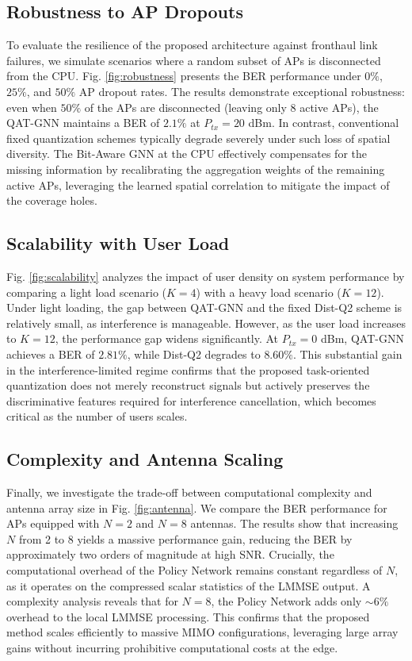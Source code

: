 \subsection{Robustness to AP Dropouts}
To evaluate the resilience of the proposed architecture against fronthaul link failures, we simulate scenarios where a random subset of APs is disconnected from the CPU. Fig. \ref{fig:robustness} presents the BER performance under $0\%$, $25\%$, and $50\%$ AP dropout rates. The results demonstrate exceptional robustness: even when $50\%$ of the APs are disconnected (leaving only 8 active APs), the QAT-GNN maintains a BER of $2.1\%$ at $P_{tx}=20$ dBm. In contrast, conventional fixed quantization schemes typically degrade severely under such loss of spatial diversity. The Bit-Aware GNN at the CPU effectively compensates for the missing information by recalibrating the aggregation weights of the remaining active APs, leveraging the learned spatial correlation to mitigate the impact of the coverage holes.

\subsection{Scalability with User Load}
Fig. \ref{fig:scalability} analyzes the impact of user density on system performance by comparing a light load scenario ($K=4$) with a heavy load scenario ($K=12$). Under light loading, the gap between QAT-GNN and the fixed Dist-Q2 scheme is relatively small, as interference is manageable. However, as the user load increases to $K=12$, the performance gap widens significantly. At $P_{tx}=0$ dBm, QAT-GNN achieves a BER of $2.81\%$, while Dist-Q2 degrades to $8.60\%$. This substantial gain in the interference-limited regime confirms that the proposed task-oriented quantization does not merely reconstruct signals but actively preserves the discriminative features required for interference cancellation, which becomes critical as the number of users scales.

\subsection{Complexity and Antenna Scaling}
Finally, we investigate the trade-off between computational complexity and antenna array size in Fig. \ref{fig:antenna}. We compare the BER performance for APs equipped with $N=2$ and $N=8$ antennas. The results show that increasing $N$ from 2 to 8 yields a massive performance gain, reducing the BER by approximately two orders of magnitude at high SNR. Crucially, the computational overhead of the Policy Network remains constant regardless of $N$, as it operates on the compressed scalar statistics of the LMMSE output. A complexity analysis reveals that for $N=8$, the Policy Network adds only $\sim 6\%$ overhead to the local LMMSE processing. This confirms that the proposed method scales efficiently to massive MIMO configurations, leveraging large array gains without incurring prohibitive computational costs at the edge.